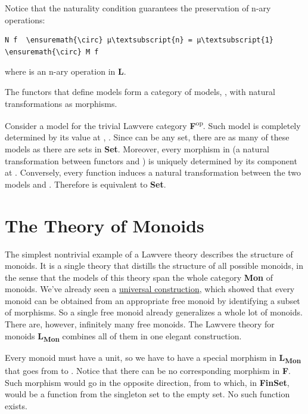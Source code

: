 Notice that the naturality condition guarantees the preservation of
n-ary operations:

\begin{Verbatim}[commandchars=\\\{\}]
N f  \ensuremath{\circ} μ\textsubscript{n} = μ\textsubscript{1}  \ensuremath{\circ} M f
\end{Verbatim}
where  is an n-ary operation in
\textbf{L}.

The functors that define models form a category of models,
, with natural transformations as morphisms.

Consider a model for the trivial Lawvere category
\textbf{F}\textsuperscript{op}. Such model is completely determined by
its value at , . Since  can be any
set, there are as many of these models as there are sets in
\textbf{Set}. Moreover, every morphism in  (a
natural transformation between functors  and ) is
uniquely determined by its component at . Conversely, every
function  induces a natural
transformation between the two models  and .
Therefore  is equivalent to \textbf{Set}.

\section{The Theory of Monoids}\label{the-theory-of-monoids}

The simplest nontrivial example of a Lawvere theory describes the
structure of monoids. It is a single theory that distills the structure
of all possible monoids, in the sense that the models of this theory
span the whole category \textbf{Mon} of monoids. We've already seen a
\hyperref[chap-free-monoids]{universal
construction}, which showed that every monoid can be obtained from an
appropriate free monoid by identifying a subset of morphisms. So a
single free monoid already generalizes a whole lot of monoids. There
are, however, infinitely many free monoids. The Lawvere theory for
monoids \textbf{L\textsubscript{Mon}} combines all of them in one
elegant construction.

Every monoid must have a unit, so we have to have a special morphism
 in \textbf{L\textsubscript{Mon}} that goes from  to
. Notice that there can be no corresponding morphism in
\textbf{F}. Such morphism would go in the opposite direction, from
 to  which, in \textbf{FinSet}, would be a function
from the singleton set to the empty set. No such function exists.

